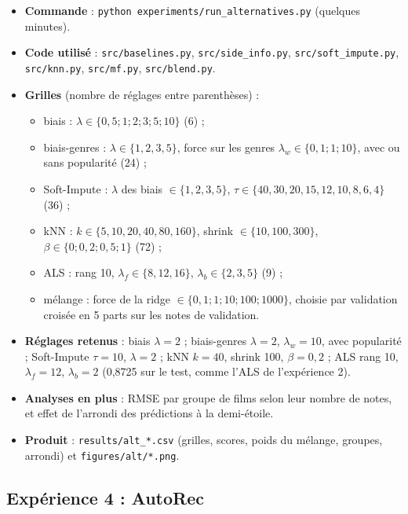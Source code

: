 \documentclass[11pt,a4paper]{article}
\begin{document}
\begin{itemize}
  \item \textbf{Commande} : \texttt{python experiments/run\_alternatives.py} (quelques minutes).
  \item \textbf{Code utilisé} : \texttt{src/baselines.py}, \texttt{src/side\_info.py},
        \texttt{src/soft\_impute.py}, \texttt{src/knn.py}, \texttt{src/mf.py}, \texttt{src/blend.py}.
  \item \textbf{Grilles} (nombre de réglages entre parenthèses) :
  \begin{itemize}
    \item biais : $\lambda \in \{0{,}5 ; 1 ; 2 ; 3 ; 5 ; 10\}$ (6) ;
    \item biais-genres : $\lambda \in \{1, 2, 3, 5\}$, force sur les genres
          $\lambda_w \in \{0{,}1 ; 1 ; 10\}$, avec ou sans popularité (24) ;
    \item Soft-Impute : $\lambda$ des biais $\in \{1, 2, 3, 5\}$,
          $\tau \in \{40, 30, 20, 15, 12, 10, 8, 6, 4\}$ (36) ;
    \item kNN : $k \in \{5, 10, 20, 40, 80, 160\}$, shrink $\in \{10, 100, 300\}$,
          $\beta \in \{0 ; 0{,}2 ; 0{,}5 ; 1\}$ (72) ;
    \item ALS : rang 10, $\lambda_f \in \{8, 12, 16\}$, $\lambda_b \in \{2, 3, 5\}$ (9) ;
    \item mélange : force de la ridge $\in \{0{,}1 ; 1 ; 10 ; 100 ; 1000\}$, choisie par
          validation croisée en 5 parts sur les notes de validation.
  \end{itemize}
  \item \textbf{Réglages retenus} : biais $\lambda = 2$ ; biais-genres $\lambda = 2$,
        $\lambda_w = 10$, avec popularité ; Soft-Impute $\tau = 10$, $\lambda = 2$ ;
        kNN $k = 40$, shrink 100, $\beta = 0{,}2$ ; ALS rang 10, $\lambda_f = 12$, $\lambda_b = 2$
        (0,8725 sur le test, comme l'ALS de l'expérience 2).
  \item \textbf{Analyses en plus} : RMSE par groupe de films selon leur nombre de notes,
        et effet de l'arrondi des prédictions à la demi-étoile.
  \item \textbf{Produit} : \texttt{results/alt\_*.csv} (grilles, scores, poids du mélange,
        groupes, arrondi) et \texttt{figures/alt/*.png}.
\end{itemize}

\subsection{Expérience 4 : AutoRec}
\end{document}
